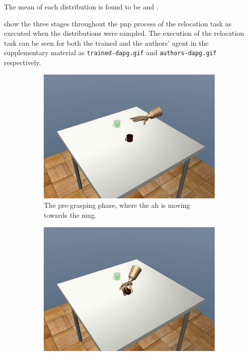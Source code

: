 The mean of each distribution is found to be  and . \medskip

 show the three stages throughout the \gls{pnp} process of the relocation task as executed when the distributions were sampled. The execution of the relocation task can be seen for both the trained and the authors' agent in the supplementary material as \texttt{trained-dapg.gif} and \texttt{authors-dapg.gif} respectively.

\begin{figure}[!h]
	\centering
	\begin{subfigure}[b]{0.32\textwidth}
		\centering
		\includegraphics[width=\textwidth]{chapters/3-in-hand-manipulation/fig/frame_10.png}
		\caption{The pre-grasping phase, where the \gls{ah} is moving towards the mug.}
		\label{fig:ai-frame-1}
	\end{subfigure}
	\hfill
	\begin{subfigure}[b]{0.32\textwidth}
		\centering
		\includegraphics[width=\textwidth]{chapters/3-in-hand-manipulation/fig/frame_21.png}

\end{subfigure}
\end{figure}

